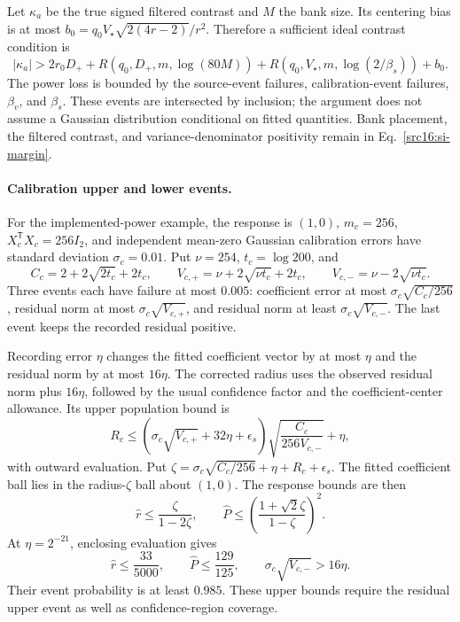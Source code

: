 Let $\kappa_a$ be the true signed filtered contrast and $M$ the bank size. Its centering bias is at most
$b_0=q_0V_\star\sqrt{2(4r-2)}/r^2$. Therefore a sufficient ideal contrast condition is
\begin{equation}\label{src16:si-margin}
 |\kappa_a|>
 2r_0D_++R(q_0,D_+,m,\log(80M))
 +R(q_0,V_\star,m,\log(2/\beta_s))+b_0.
\end{equation}
The power loss is bounded by the source-event failures, calibration-event failures, $\beta_v$, and $\beta_s$. These events are intersected by inclusion; the argument does not assume a Gaussian distribution conditional on fitted quantities. Bank placement, the filtered contrast, and variance-denominator positivity remain in Eq.~\eqref{src16:si-margin}.

\paragraph{Calibration upper and lower events.}
For the implemented-power example, the response is $(1,0)$, $m_c=256$, $X_c^{\mathsf T}X_c=256I_2$, and independent mean-zero Gaussian calibration errors have standard deviation $\sigma_c=0.01$. Put $\nu=254$, $t_c=\log200$, and
\[
 C_c=2+2\sqrt{2t_c}+2t_c,\qquad
 V_{c,+}=\nu+2\sqrt{\nu t_c}+2t_c,\qquad
 V_{c,-}=\nu-2\sqrt{\nu t_c}.
\]
Three events each have failure at most $0.005$: coefficient error at most $\sigma_c\sqrt{C_c/256}$, residual norm at most $\sigma_c\sqrt{V_{c,+}}$, and residual norm at least $\sigma_c\sqrt{V_{c,-}}$. The last event keeps the recorded residual positive.

Recording error $\eta$ changes the fitted coefficient vector by at most $\eta$ and the residual norm by at most $16\eta$. The corrected radius uses the observed residual norm plus $16\eta$, followed by the usual confidence factor and the coefficient-center allowance. Its upper population bound is
\begin{equation}\label{src16:si-cal-radius}
 R_c\le\left(\sigma_c\sqrt{V_{c,+}}+32\eta+\epsilon_s\right)
          \sqrt{\frac{C_c}{256V_{c,-}}}+\eta,
\end{equation}
with outward evaluation. Put
$\zeta=\sigma_c\sqrt{C_c/256}+\eta+R_c+\epsilon_s$.
The fitted coefficient ball lies in the radius-$\zeta$ ball about $(1,0)$. The response bounds are then
\[
 \widehat r\le\frac{\zeta}{1-2\zeta},\qquad
 \widehat P\le\left(\frac{1+\sqrt2\zeta}{1-\zeta}\right)^2.
\]
At $\eta=2^{-21}$, enclosing evaluation gives
\begin{equation}\label{src16:si-cal-quality}
 \widehat r\le\frac{33}{5000},\qquad
 \widehat P\le\frac{129}{125},\qquad
 \sigma_c\sqrt{V_{c,-}}>16\eta.
\end{equation}
Their event probability is at least $0.985$. These upper bounds require the residual upper event as well as confidence-region coverage.

